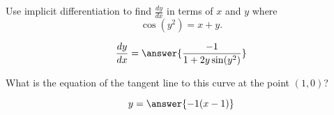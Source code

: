 \documentclass{ximera}
\author{Steven Gubkin}
\begin{document}
\begin{exercise}

Use implicit differentiation to find $\frac{dy}{dx}$ in terms  of $x$ and $y$ where
\[
\cos(y^2) = x+y.
\]
\begin{prompt}
\[
\frac{dy}{dx} = \answer{\frac{-1}{1+2y\sin(y^2)}}
\]
\end{prompt}
What is the equation of the tangent line to this curve at the point $(1,0)$?
\begin{prompt}
\[
y = \answer{-1(x-1)}
\]
\end{prompt}
\end{exercise}
\end{document}
